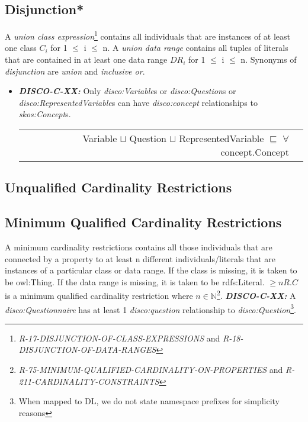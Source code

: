 \documentclass{llncs}
\newenvironment{DL}{
  \vspace{0cm}
  \begin{tabular}{r l}

}{
  \end{tabular}
}
\begin{document}
\subsection{Disjunction*}

A \emph{union class expression}\footnote{{\em R-17-DISJUNCTION-OF-CLASS-EXPRESSIONS} and {\em R-18-DISJUNCTION-OF-DATA-RANGES}} contains all individuals that are instances of at least one class $C_{i}$ for 1 $\leq$ i $\leq$ n. 
A \emph{union data range} contains all tuples of literals that are contained in at least one data range $DR_{i}$ for 1 $\leq$ i $\leq$ n.
Synonyms of {\em disjunction} are {\em union} and {\em inclusive or}.

\begin{itemize}
	\item \textbf{{\em DISCO-C-XX:}} 
Only {\em disco:Variable}s or {\em disco:Question}s or {\em disco:RepresentedVariable}s can have {\em disco:concept} relationships to {\em skos:Concept}s.

\begin{DL}
Variable $\sqcup$ Question $\sqcup$ RepresentedVariable $\sqsubseteq$ $\forall$ concept.Concept \\
\end{DL}
\end{itemize}






\subsection{Unqualified Cardinality Restrictions}

\subsection{Minimum Qualified Cardinality Restrictions}

A minimum cardinality restrictions contains all those individuals that are connected by a property to at least n different individuals/literals 
that are instances of a particular class or data range. If the class is missing, it is taken to be owl:Thing. 
If the data range is missing, it is taken to be rdfs:Literal.
$\geq n R. C$ is a minimum qualified cardinality restriction where $n \in \mathbb{N}$\footnote{{\em R-75-MINIMUM-QUALIFIED-CARDINALITY-ON-PROPERTIES} and {\em R-211-CARDINALITY-CONSTRAINTS}}.
\textbf{{\em DISCO-C-XX:}}
A {\em disco:Questionnaire} has at least 1 {\em disco:question} relationship to {\em disco:Question}\footnote{When mapped to DL, we do not state namespace prefixes for simplicity reasons}.
\end{document}
